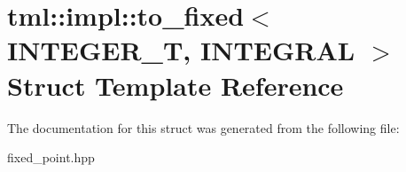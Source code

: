 \hypertarget{structtml_1_1impl_1_1to__fixed}{\section{tml\+:\+:impl\+:\+:to\+\_\+fixed$<$ I\+N\+T\+E\+G\+E\+R\+\_\+\+T, I\+N\+T\+E\+G\+R\+A\+L $>$ Struct Template Reference}
\label{structtml_1_1impl_1_1to__fixed}
}


The documentation for this struct was generated from the following file\+:\begin{DoxyCompactItemize}
\item 
fixed\+\_\+point.\+hpp\end{DoxyCompactItemize}
